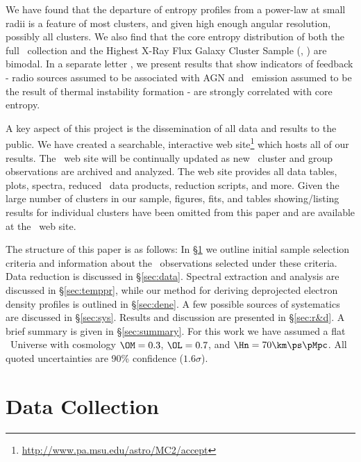 \documentclass{emulateapj}
\begin{document}
We have found that the departure of entropy profiles from a power-law
at small radii is a feature of most clusters, and given high enough
angular resolution, possibly all clusters. We also find that the core
entropy distribution of both the full \accept\ collection and the
Highest X-Ray Flux Galaxy Cluster Sample (\hifl, \citealt{hiflugcs1,
hiflugcs2}) are bimodal. In a separate letter \citep{haradent}, we
present results that show indicators of feedback - radio sources
assumed to be associated with AGN and \halpha\ emission assumed to be
the result of thermal instability formation - are strongly correlated
with core entropy.

A key aspect of this project is the dissemination of all data and
results to the public. We have created a searchable, interactive web
site\footnote{\url{http://www.pa.msu.edu/astro/MC2/accept}} which
hosts all of our results. The \accept\ web site will be continually
updated as new \chandra\ cluster and group observations are archived
and analyzed. The web site provides all data tables, plots, spectra,
reduced \chandra\ data products, reduction scripts, and more. Given
the large number of clusters in our sample, figures, fits, and tables
showing/listing results for individual clusters have been omitted from
this paper and are available at the \accept\ web site.

The structure of this paper is as follows: In \S\ref{sec:sample} we
outline initial sample selection criteria and information about the
\chandra\ observations selected under these criteria. Data reduction
is discussed in \S\ref{sec:data}. Spectral extraction and analysis are
discussed in \S\ref{sec:temppr}, while our method for deriving
deprojected electron density profiles is outlined in
\S\ref{sec:dene}. A few possible sources of systematics are discussed
in \S\ref{sec:sys}. Results and discussion are presented in
\S\ref{sec:r&d}. A brief summary is given in \S\ref{sec:summary}. For
this work we have assumed a flat \LCDM\ Universe with cosmology
$\OM=0.3$, $\OL=0.7$, and $\Hn=70\km\ps\pMpc$. All quoted
uncertainties are 90\% confidence ($1.6\sigma$).

\section{Data Collection}
\label{sec:sample}
\end{document}
